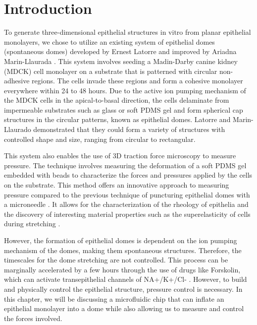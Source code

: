 \hypertarget{introduction}{%
\section{Introduction}\label{introduction1}}

To generate three-dimensional epithelial structures in vitro from planar epithelial monolayers, we chose to utilize an existing system of epithelial domes (spontaneous domes) developed by Ernest Latorre and improved by Ariadna Marin-Llaurada \cite{latorre2018,marin-llaurado2022}. This system involves seeding a Madin-Darby canine kidney (MDCK) cell monolayer on a substrate that is patterned with circular non-adhesive regions. The cells invade these regions and form a cohesive monolayer everywhere within 24 to 48 hours. Due to the active ion pumping mechanism of the MDCK cells in the apical-to-basal direction, the cells delaminate from impermeable substrates such as glass or soft PDMS gel and form spherical cap structures in the circular patterns, known as epithelial domes. Latorre and Marin-Llaurado demonstrated that they could form a variety of structures with controlled shape and size, ranging from circular to rectangular.  

This system also enables the use of 3D traction force microscopy to measure pressure. The technique involves measuring the deformation of a soft PDMS gel embedded with beads to characterize the forces and pressures applied by the cells on the substrate. This method offers an innovative approach to measuring pressure compared to the previous technique of puncturing epithelial domes with a microneedle \cite{tanner1983, choudhury2022}. It allows for the characterization of the rheology of epithelia and the discovery of interesting material properties such as the superelasticity of cells during stretching \cite{latorre2018}.  

However, the formation of epithelial domes is dependent on the ion pumping mechanism of the domes, making them spontaneous structures. Therefore, the timescales for the dome stretching are not controlled. This process can be marginally accelerated by a few hours through the use of drugs like Forskolin, which can activate transepithelial channels of NA+/K+/Cl-  \cite{klebe1995,bourke1987}. However, to build and physically control the epithelial structure, pressure control is necessary. In this chapter, we will be discussing a microfluidic chip that can inflate an epithelial monolayer into a dome while also allowing us to measure and control the forces involved.



